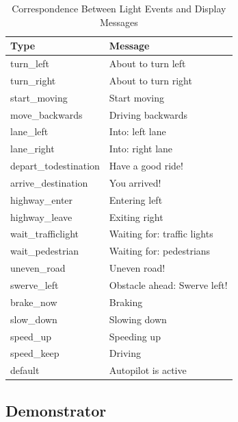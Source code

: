 \begin{table}[ht]
\caption{Correspondence Between Light Events and Display Messages}
\label{tab:display}
\footnotesize
\begin{tabular}{ll}
\toprule
Type        &  Message                      \\
\midrule
turn\_left            & About to turn left           \\
turn\_right           & About to turn right          \\
start\_moving         & Start moving                 \\
move\_backwards       & Driving backwards            \\
lane\_left            & Into: left lane              \\
lane\_right           & Into: right lane             \\
depart\_todestination & Have a good ride!            \\
arrive\_destination   & You arrived!                 \\
highway\_enter        & Entering left                \\
highway\_leave        & Exiting right                \\
wait\_trafficlight    & Waiting for: traffic lights  \\
wait\_pedestrian      & Waiting for: pedestrians     \\
uneven\_road          & Uneven road!                 \\
swerve\_left          & Obstacle ahead: Swerve left! \\
brake\_now            & Braking                      \\
slow\_down            & Slowing down                 \\
speed\_up             & Speeding up                  \\
speed\_keep           & Driving                      \\
default               & Autopilot is active         
\end{tabular}
\end{table}

\subsection{Demonstrator}

